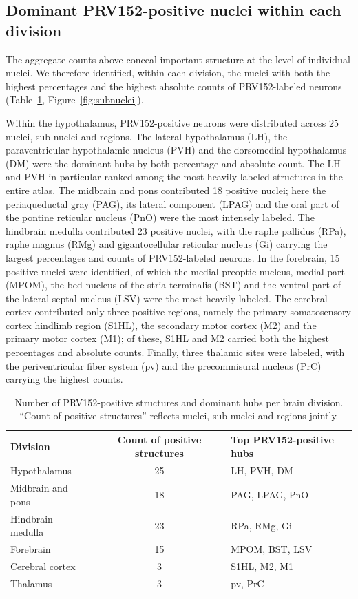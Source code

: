 \documentclass[11pt]{article}
\begin{document}
\subsection{Dominant PRV152-positive nuclei within each division}

The aggregate counts above conceal important structure at the level of individual nuclei. We therefore identified, within each division, the nuclei with both the highest percentages and the highest absolute counts of PRV152-labeled neurons (Table~\ref{tab:hotspots}, Figure~\ref{fig:subnuclei}).

Within the hypothalamus, PRV152-positive neurons were distributed across 25 nuclei, sub-nuclei and regions. The lateral hypothalamus (LH), the paraventricular hypothalamic nucleus (PVH) and the dorsomedial hypothalamus (DM) were the dominant hubs by both percentage and absolute count. The LH and PVH in particular ranked among the most heavily labeled structures in the entire atlas. The midbrain and pons contributed 18 positive nuclei; here the periaqueductal gray (PAG), its lateral component (LPAG) and the oral part of the pontine reticular nucleus (PnO) were the most intensely labeled. The hindbrain medulla contributed 23 positive nuclei, with the raphe pallidus (RPa), raphe magnus (RMg) and gigantocellular reticular nucleus (Gi) carrying the largest percentages and counts of PRV152-labeled neurons. In the forebrain, 15 positive nuclei were identified, of which the medial preoptic nucleus, medial part (MPOM), the bed nucleus of the stria terminalis (BST) and the ventral part of the lateral septal nucleus (LSV) were the most heavily labeled. The cerebral cortex contributed only three positive regions, namely the primary somatosensory cortex hindlimb region (S1HL), the secondary motor cortex (M2) and the primary motor cortex (M1); of these, S1HL and M2 carried both the highest percentages and absolute counts. Finally, three thalamic sites were labeled, with the periventricular fiber system (pv) and the precommisural nucleus (PrC) carrying the highest counts.

\begin{table}[htbp]
\centering
\caption{Number of PRV152-positive structures and dominant hubs per brain division. ``Count of positive structures'' reflects nuclei, sub-nuclei and regions jointly.}
\label{tab:hotspots}
\begin{tabular}{lcl}
\toprule
Division & Count of positive structures & Top PRV152-positive hubs \\
\midrule
Hypothalamus & 25 & LH, PVH, DM \\
Midbrain and pons & 18 & PAG, LPAG, PnO \\
Hindbrain medulla & 23 & RPa, RMg, Gi \\
Forebrain & 15 & MPOM, BST, LSV \\
Cerebral cortex & 3 & S1HL, M2, M1 \\
Thalamus & 3 & pv, PrC \\
\bottomrule
\end{tabular}
\end{table}
\end{document}
